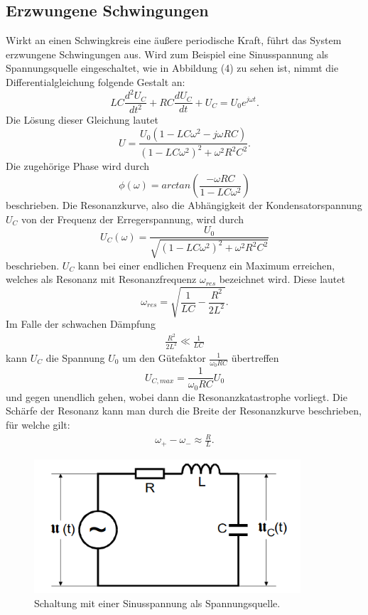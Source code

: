 \subsection{Erzwungene Schwingungen}
Wirkt an einen Schwingkreis eine äußere periodische Kraft, führt das System erzwungene Schwingungen aus.
Wird zum Beispiel eine Sinusspannung als Spannungsquelle eingeschaltet, wie in Abbildung (4) zu sehen ist,
nimmt die Differentialgleichung folgende Gestalt an:
\begin{equation}
LC\frac{d^2 U_C}{dt^2} + RC\frac{d U_C}{dt} + U_C = U_0 e^{j\omega t} .
\end{equation}
Die Lösung dieser Gleichung lautet
\begin{equation}
U = \frac{U_0(1-LC\omega^2 - j\omega RC)}{(1-LC\omega^2)^2 + \omega^2 R^2 C^2} .
\end{equation}
Die zugehörige Phase wird durch 
\begin{equation}
\phi(\omega) = arctan(\frac{-\omega RC}{1-LC\omega^2})
\end{equation}
beschrieben.
Die Resonanzkurve, also die Abhängigkeit der Kondensatorspannung $U_C$ von der Frequenz der Erregerspannung, wird durch
\begin{equation}
U_C(\omega) = \frac{U_0}{\sqrt{(1-LC\omega^2)^2 + \omega^2 R^2 C^2}}
\end{equation}
beschrieben. $U_C$ kann bei einer endlichen Frequenz ein Maximum erreichen, welches als Resonanz mit Resonanzfrequenz $\omega_{res}$ bezeichnet wird.
Diese lautet
\begin{equation}
\omega_{res} = \sqrt{\frac{1}{LC} - \frac{R^2}{2L^2}} .
\end{equation}
Im Falle der schwachen Dämpfung
\begin{align*}
\frac{R^2}{2L^2} \ll \frac{1}{LC}
\end{align*}
kann $U_C$ die Spannung $U_0$ um den Gütefaktor $\frac{1}{\omega_0 RC}$ übertreffen 
\begin{equation}
U_{C,max} = \frac{1}{\omega_0 RC}U_0
\end{equation}
und gegen unendlich gehen, wobei dann die Resonanzkatastrophe vorliegt.
Die Schärfe der Resonanz kann man durch die Breite der Resonanzkurve beschrieben, für welche gilt:
\begin{align*}
\omega _+ - \omega _- \approx \frac{R}{L} .
\end{align*}
\begin{figure}[H]
  \centering
  \includegraphics[height=5cm]{erzwungen.png}
  \caption{Schaltung mit einer Sinusspannung als Spannungsquelle. \cite[S.6]{kent}}
\end{figure}
